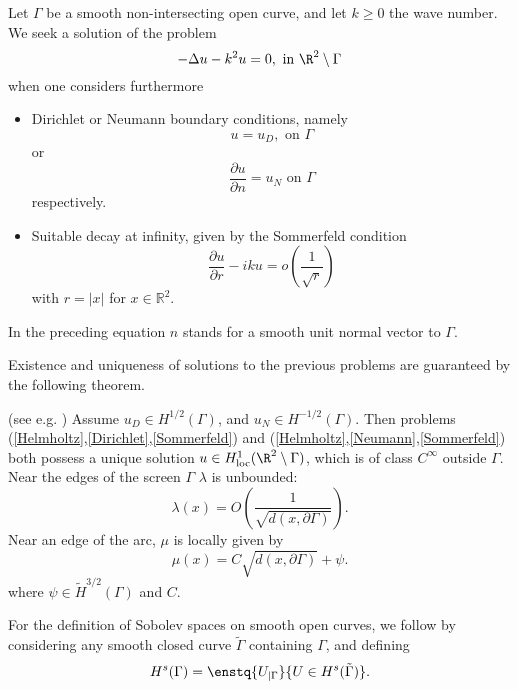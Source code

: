 \documentclass[a4paper]{article}
\begin{document}
	Let $\Gamma$ be a smooth non-intersecting open curve, and let $k \geq 0$ the wave number. We seek a solution of the problem
	\begin{equation}
	-\Delta u - k^2 u = 0,  \text{ in } \R^2 \setminus \Gamma
	\label{Helmholtz}
	\end{equation}
	when one considers furthermore
	\begin{itemize}
		\item Dirichlet or Neumann boundary conditions, namely
		\begin{equation}
		u = u_D, \text{ on } \Gamma
		\label{Dirichlet}
		\end{equation}
		or
		\begin{equation}
		\dfrac{\partial u}{\partial n} = u_N  \text{ on } \Gamma 
		\label{Neumann}
		\end{equation}
		respectively.
		\item Suitable decay at infinity, given by the Sommerfeld condition
		\begin{equation}
		\dfrac{\partial u}{\partial r} - iku = o\left(\frac{1}{\sqrt{r}}\right)
		\label{Sommerfeld}
		\end{equation}
		with $r=|x|$ for $x\in \mathbb{R}^2$.
	\end{itemize}
	In the preceding equation $n$ stands for a smooth unit normal vector to $\Gamma$.
	
	Existence and uniqueness of solutions to the previous problems are guaranteed by the following theorem.
	\begin{The}(see e.g. \cite{stephan1984augmented,wendland1990hypersingular,monch1996numerical}) Assume $u_D \in H^{1/2}(\Gamma)$, and $u_N \in H^{-1/2}(\Gamma)$. Then problems (\ref{Helmholtz},\ref{Dirichlet},\ref{Sommerfeld}) and (\ref{Helmholtz},\ref{Neumann},\ref{Sommerfeld}) both possess a unique solution $u \in H^1_\textup{loc}(\R^2 \setminus \Gamma)$, which is of class $C^{\infty}$ outside $\Gamma$. Near the edges of the screen $\Gamma$ $\lambda$ is unbounded:
		\[\lambda(x) = O\left(\frac{1}{\sqrt{d(x,\partial \Gamma)}}\right).\]
	 	Near an edge of the arc, $\mu$ is locally given by
		\[\mu(x) = C\sqrt{d(x,\partial \Gamma)} + \psi.\]
		where $\psi \in \tilde{H}^{3/2}(\Gamma)$ and $C$.
	\end{The}
	
	For the definition of Sobolev spaces on smooth open curves, we follow
	\cite{mclean2000strongly} by considering any smooth closed curve $\tilde{\Gamma}$ containing $\Gamma$, and defining 
	\[H^s(\Gamma) = \enstq{U_{|\Gamma}}{ U \in H^s(\tilde{\Gamma}) }.\]
	
\end{document}
